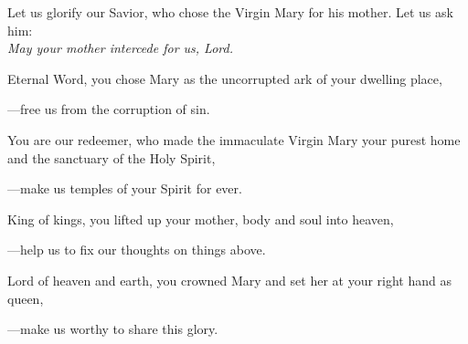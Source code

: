 \intercessions\indent

\begin{hangpar}

Let us glorify our Savior, who chose the Virgin Mary for his mother. Let us ask him:\\
\emph{May your mother intercede for us, Lord.}

\medskip Eternal Word, you chose Mary as the uncorrupted ark of your dwelling place,

{\color{red}---\thinspace}free us from the corruption of sin.

\medskip You are our redeemer, who made the immaculate Virgin Mary your purest home and the sanctuary of the Holy Spirit,

{\color{red}---\thinspace}make us temples of your Spirit for ever.

\medskip King of kings, you lifted up your mother, body and soul into heaven,

{\color{red}---\thinspace}help us to fix our thoughts on things above.

\medskip Lord of heaven and earth, you crowned Mary and set her at your right hand as queen,

{\color{red}---\thinspace}make us worthy to share this glory.

\medskip

\end{hangpar}